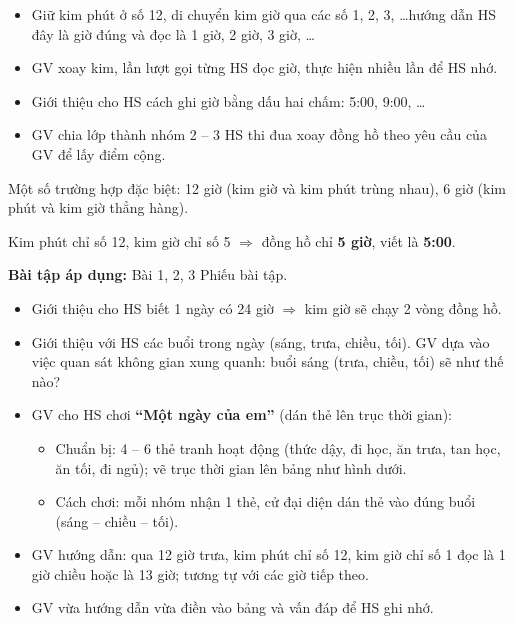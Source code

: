 \documentclass[../main.tex]{subfiles}
\begin{document}
\begin{itemize}
    \item Giữ kim phút ở số 12, di chuyển kim giờ qua các số 1, 2, 3, \dots hướng dẫn HS đây là giờ đúng và đọc là 1 giờ, 2 giờ, 3 giờ, \dots
    \item GV xoay kim, lần lượt gọi từng HS đọc giờ, thực hiện nhiều lần để HS nhớ.
    \item Giới thiệu cho HS cách ghi giờ bằng dấu hai chấm: 5:00, 9:00, \dots
    \item GV chia lớp thành nhóm 2 -- 3 HS thi đua xoay đồng hồ theo yêu cầu của GV để lấy điểm cộng.
\end{itemize}
\begin{luuy}
    Một số trường hợp đặc biệt: 12 giờ (kim giờ và kim phút trùng nhau), 6 giờ (kim phút và kim giờ thẳng hàng).
\end{luuy}
\begin{vd}
    Kim phút chỉ số 12, kim giờ chỉ số 5 $\Rightarrow$ đồng hồ chỉ \textbf{5 giờ}, viết là \textbf{5:00}.
\end{vd}
\textbf{Bài tập áp dụng:} Bài 1, 2, 3 Phiếu bài tập.

\begin{itemize}
    \item Giới thiệu cho HS biết 1 ngày có 24 giờ $\Rightarrow$ kim giờ sẽ chạy 2 vòng đồng hồ.
    \item Giới thiệu với HS các buổi trong ngày (sáng, trưa, chiều, tối). GV dựa vào việc quan sát không gian xung quanh: buổi sáng (trưa, chiều, tối) sẽ như thế nào?
    \item GV cho HS chơi \textbf{“Một ngày của em”} (dán thẻ lên trục thời gian):
    \begin{itemize}
        \item Chuẩn bị: 4 -- 6 thẻ tranh hoạt động (thức dậy, đi học, ăn trưa, tan học, ăn tối, đi ngủ); vẽ trục thời gian lên bảng như hình dưới.
        \item Cách chơi: mỗi nhóm nhận 1 thẻ, cử đại diện dán thẻ vào đúng buổi (sáng -- chiều -- tối).
    \end{itemize}
\end{itemize}
\begin{itemize}
    \item GV hướng dẫn: qua 12 giờ trưa, kim phút chỉ số 12, kim giờ chỉ số 1 đọc là 1 giờ chiều hoặc là 13 giờ; tương tự với các giờ tiếp theo.
    \item GV vừa hướng dẫn vừa điền vào bảng và vấn đáp để HS ghi nhớ.
\end{itemize}
\end{document}
